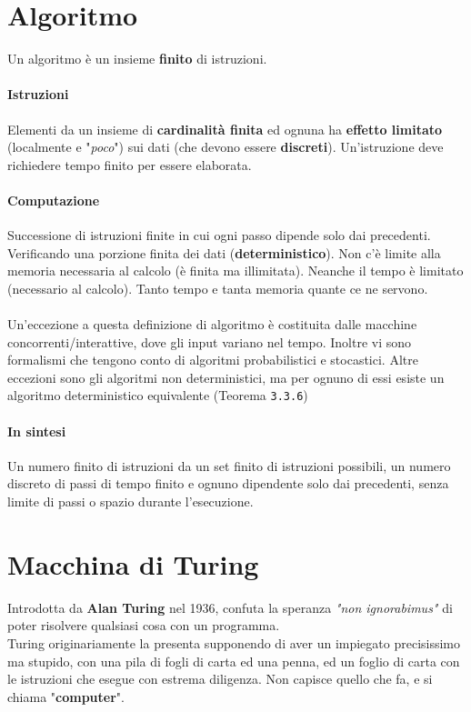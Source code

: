 \documentclass[10pt]{book}
\begin{document}
\section{Algoritmo}
Un algoritmo è un insieme \textbf{finito} di istruzioni.
\paragraph{Istruzioni} Elementi da un insieme di \textbf{cardinalità finita} ed ognuna ha \textbf{effetto limitato} (localmente e "\textit{poco}") sui dati (che devono essere \textbf{discreti}). Un'istruzione deve richiedere tempo finito per essere elaborata.
\paragraph{Computazione} Successione di istruzioni finite in cui ogni passo dipende solo dai precedenti. Verificando una porzione finita dei dati (\textbf{deterministico}). Non c'è limite alla memoria necessaria al calcolo (è finita ma illimitata). Neanche il tempo è limitato (necessario al calcolo). Tanto tempo e tanta memoria quante ce ne servono.\\\\
Un'eccezione a questa definizione di algoritmo è costituita dalle macchine concorrenti/interattive, dove gli input variano nel tempo. Inoltre vi sono formalismi che tengono conto di algoritmi probabilistici e stocastici. Altre eccezioni sono gli algoritmi non deterministici, ma per ognuno di essi esiste un algoritmo deterministico equivalente (Teorema \texttt{3.3.6})
\paragraph{In sintesi} Un numero finito di istruzioni da un set finito di istruzioni possibili, un numero discreto di passi di tempo finito e ognuno dipendente solo dai precedenti, senza limite di passi o spazio durante l'esecuzione.
\pagebreak
\section{Macchina di Turing}
Introdotta da \textbf{Alan Turing} nel 1936, confuta la speranza \textit{"non ignorabimus"} di poter risolvere qualsiasi cosa con un programma.\\
Turing originariamente la presenta supponendo di aver un impiegato precisissimo ma stupido, con una pila di fogli di carta ed una penna, ed un foglio di carta con le istruzioni che esegue con estrema diligenza. Non capisce quello che fa, e si chiama "\textbf{computer}".
\end{document}

